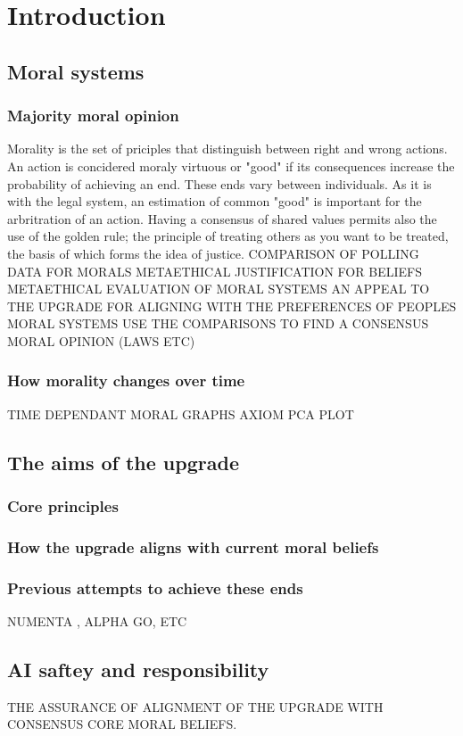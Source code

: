 \chapter{Introduction}
\minitoc
\section{Moral systems}
\subsection{Majority moral opinion}
Morality is the set of priciples that distinguish between right and wrong actions. An action is concidered moraly virtuous or "good" if its consequences increase the probability of achieving an end. These ends vary between individuals. As it is with the legal system, an estimation of common "good" is important for the arbritration of an action. Having a consensus of shared values permits also the use of the golden rule; the principle of treating others as you want to be treated, the basis of which forms the idea of justice. 
COMPARISON OF POLLING DATA FOR MORALS
METAETHICAL JUSTIFICATION FOR BELIEFS
METAETHICAL EVALUATION OF MORAL SYSTEMS
AN APPEAL TO THE UPGRADE FOR ALIGNING WITH THE PREFERENCES OF PEOPLES MORAL SYSTEMS
USE THE COMPARISONS TO FIND A CONSENSUS MORAL OPINION (LAWS ETC)
\subsection{How morality changes over time}
TIME DEPENDANT MORAL GRAPHS
AXIOM PCA PLOT
\section{The aims of the upgrade}
\subsection{Core principles}
\subsection{How the upgrade aligns with current moral beliefs}
\subsection{Previous attempts to achieve these ends}
NUMENTA \cite{numentahome}, ALPHA GO, ETC
\section{AI saftey and responsibility}
THE ASSURANCE OF ALIGNMENT OF THE UPGRADE WITH CONSENSUS CORE MORAL BELIEFS.

